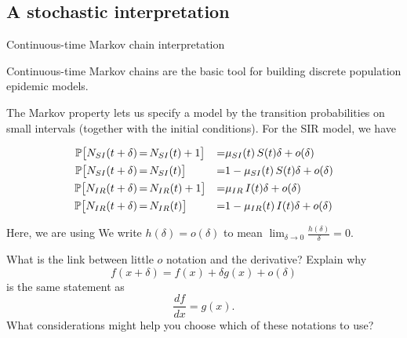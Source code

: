 \subsection{A stochastic interpretation}

\begin{frame}{Continuous-time Markov chain interpretation}

  \bi

\item Continuous-time Markov chains are the basic tool for building discrete population epidemic models.

\item The Markov property lets us specify a model by the transition probabilities on small intervals (together with the initial conditions). For the SIR model, we have

  \begin{equation*}
    \begin{aligned}
      \mathbb{P}\big[N_{SI}(t+\delta)&{ \, = \, } N_{SI}(t)+1\big] &=& \mu_{SI}(t) \, S(t) \delta + o(\delta)
      \\
      \mathbb{P}\big[N_{SI}(t+\delta)&{ \, = \, } N_{SI}(t)\big] &=& 1-\mu_{SI}(t) \, S(t) \delta + o(\delta)
      \\
      \mathbb{P}\big[N_{IR}(t+\delta)&{ \, = \, } N_{IR}(t)+1\big] &=& \mu_{IR} \, I(t) \delta + o(\delta)
      \\
      \mathbb{P}\big[N_{IR}(t+\delta)&{ \, = \, } N_{IR}(t)\big] &=& 1-\mu_{IR}(t) \, I(t) \delta + o(\delta)
    \end{aligned}
  \end{equation*}

\item Here, we are using 
  We write 
  $h(\delta)=o(\delta)$
  to mean 
  $\lim_{\delta\to 0} \frac{h(\delta)}{\delta} = 0$.
  \ei
\end{frame}

\begin{frame}{\myexercise}

  What is the link between little $o$ notation and the derivative?
  Explain why 
  $$f(x+\delta)=f(x)+ \delta g(x) + o(\delta)$$ 
  is the same statement as
  $$ \frac{df}{dx} = g(x).$$
  What considerations might help you choose which of these notations to use?

  \vspace{3mm}



\end{frame}

